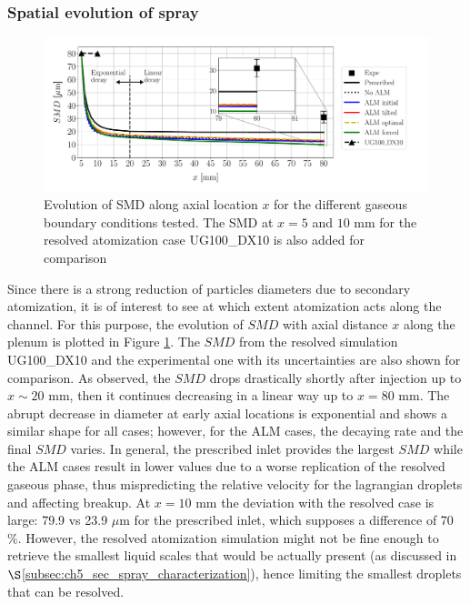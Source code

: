 \subsubsection*{Spatial evolution of spray}

\begin{figure}[h!]
\centering
\includegraphics[scale=0.45]{./part2_developments/figures_ch6_lagrangian_JICF/params_gaseous_initial_conditions/SMD_vs_x_gaseous_BCs_comparison}
\vspace*{-0.4in}
\caption[Evolution of SMD along axial location $x$ for the different gaseous boundary conditions tested]{Evolution of SMD along axial location $x$ for the different gaseous boundary conditions tested. The SMD at $x = 5$ and $10$ mm for the resolved atomization case UG100\_DX10 is also added for comparison}
\label{fig:SMD_vs_x_param_gaseous_BCs}
\end{figure}


Since there is a strong reduction of particles diameters due to secondary atomization, it is of interest to see at which extent atomization acts along the channel. For this purpose, the evolution of $SMD$ with axial distance $x$ along the plenum is plotted in Figure \ref{fig:SMD_vs_x_param_gaseous_BCs}. The $SMD$ from the resolved simulation UG100\_DX10 and the experimental one with its uncertainties are also shown for comparison. As observed, the $SMD$ drops drastically shortly after injection up to $x \sim 20$ mm, then it continues decreasing in a linear way up to $x = 80$ mm. The abrupt decrease in diameter at early axial locations is exponential and shows a similar shape for all cases;  however, for the ALM cases, the decaying rate and the final $SMD$ varies. In general, the prescribed inlet provides the largest $SMD$ while the ALM cases result in lower values due to a worse replication of the resolved gaseous phase, thus mispredicting the relative velocity for the lagrangian droplets and affecting breakup. At $x = 10$ mm the deviation with the resolved case is large: 79.9 vs 23.9 $\mu$m for the prescribed inlet, which supposes a difference of 70 $\%$.  However,  the resolved atomization simulation might not be fine enough to retrieve the smallest liquid scales that would be actually present (as discussed in $\S$\ref{subsec:ch5_sec_spray_characterization}), hence limiting the smallest droplets that can be resolved.


